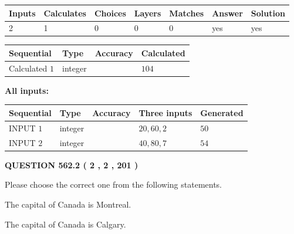 \documentclass[12pt]{article}
\begin{document}
   
   
   
\noindent\begin{tabular}{|l|l|l|l|l|l|l|}
 \hline
Inputs & Calculates & Choices & Layers & Matches & Answer & Solution \\ \hline
 2  & 
 1  & 
 0
  & 
 0  & 
 0  & 
  yes & 
  yes 
  \\ \hline
 \end{tabular}
   
   
   
   
\noindent{}
   
   
  
  
\noindent\begin{tabular}{|l|l|l|l|}
\hline
 Sequential & Type & Accuracy & Calculated \\ 
\hline
 
 
  Calculated $  1 $ & integer &  & 
  $ 104 $ 
 \\  \hline  
 \end{tabular}
   
   
   
   
\noindent\vspace{0.1in}\hspace{-0.08in} {\textbf{\Large{All inputs: }}}
   
   
  
  
\noindent\begin{tabular}{|l|l|l|l|l|}
\hline
 Sequential & Type & Accuracy & Three inputs & Generated \\ 
\hline
 
 
  INPUT $  1 $ & integer &  & $
 20
 , 
 60
 , 
 2
 $ & $ 50 $ 
 \\  \hline  
 
 
  INPUT $  2 $ & integer &  & $
 40
 , 
 80
 , 
 7
 $ & $ 54 $ 
 \\  \hline  
 \end{tabular}
   
   
  
\vspace{0.2in}
  
{\textbf{\Large{QUESTION
562.2 
 ( 2 , 2 , 201 )
}}}
  
  
Please choose the correct one from the following statements.
 
 
The capital of Canada is Montreal.
 
 
The capital of Canada is Calgary.
 
\end{document}
